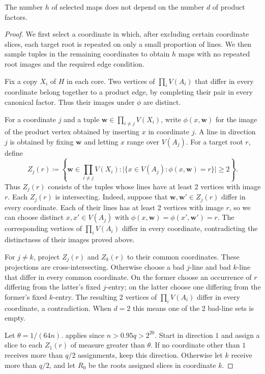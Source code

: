 \documentclass[10pt]{article}
\numberwithin{equation}{section}
\theoremstyle{definition}
\begin{document}
The number $h$ of selected maps does not depend on the number $d$ of product factors.
\begin{proof}
We first select a coordinate in which, after excluding certain coordinate slices, each target root is repeated on only a small proportion of lines. We then sample tuples in the remaining coordinates to obtain $h$ maps with no repeated root images and the required edge condition.

Fix a copy $X_i$ of $H$ in each core. Two vertices of $\prod_i V(A_i)$ that differ in every coordinate belong together to a product edge, by completing their pair in every canonical factor. Thus their images under $\phi$ are distinct.

For a coordinate $j$ and a tuple $\boldsymbol w\in\prod_{i\ne j}V(X_i)$, write $\phi(x,\boldsymbol w)$ for the image of the product vertex obtained by inserting $x$ in coordinate $j$. A line in direction $j$ is obtained by fixing $\boldsymbol w$ and letting $x$ range over $V(A_j)$. For a target root $r$, define
\[
 Z_j(r)\coloneqq\left\{\boldsymbol w\in\prod_{i\ne j}V(X_i)\colon
 \bigl|\{x\in V(A_j)\colon\phi(x,\boldsymbol w)=r\}\bigr|\ge2\right\}.
\]
Thus $Z_j(r)$ consists of the tuples whose lines have at least 2 vertices with image $r$. Each $Z_j(r)$ is intersecting. Indeed, suppose that $\boldsymbol w,\boldsymbol w'\in Z_j(r)$ differ in every coordinate. Each of their lines has at least 2 vertices with image $r$, so we can choose distinct $x,x'\in V(A_j)$ with $\phi(x,\boldsymbol w)=\phi(x',\boldsymbol w')=r$. The corresponding vertices of $\prod_iV(A_i)$ differ in every coordinate, contradicting the distinctness of their images proved above.

For $j\ne k$, project $Z_j(r)$ and $Z_k(r)$ to their common coordinates. These projections are cross-intersecting. Otherwise choose a bad $j$-line and bad $k$-line that differ in every common coordinate. On the former choose an occurrence of $r$ differing from the latter's fixed $j$-entry; on the latter choose one differing from the former's fixed $k$-entry. The resulting 2 vertices of $\prod_iV(A_i)$ differ in every coordinate, a contradiction. When $d=2$ this means one of the 2 bad-line sets is empty.

Let $\theta=1/(64n)$.  applies since $n>0.95q>2^{20}$. Start in direction $1$ and assign a slice to each $Z_1(r)$ of measure greater than $\theta$. If no coordinate other than $1$ receives more than $q/2$ assignments, keep this direction. Otherwise let $k$ receive more than $q/2$, and let $R_0$ be the roots assigned slices in coordinate $k$.


\end{proof}
\end{document}
